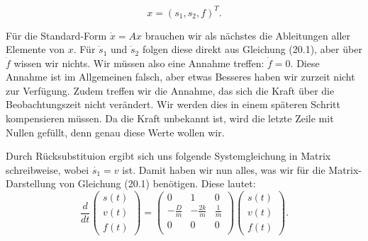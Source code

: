 \[ 
 x = (s_1, s_2, f)^T.
  \] 
  
Für die Standard-Form $\dot x = Ax$ brauchen wir als nächstes die Ableitungen aller Elemente von $x$. Für $\dot s_1$ und $\dot s_2$ folgen diese direkt aus Gleichung (20.1), aber über $\dot f$ wissen wir nichts. 
Wir müssen also eine Annahme treffen: $\dot f = 0$. Diese Annahme ist im Allgemeinen falsch, aber etwas Besseres haben wir zurzeit nicht zur Verfügung. 
Zudem treffen wir die Annahme, das sich die Kraft über die Beobachtungszeit nicht verändert.
Wir werden dies in einem späteren Schritt kompensieren müssen.
Da die Kraft unbekannt ist, wird die letzte Zeile mit Nullen gefüllt, denn genau diese Werte wollen wir. 


Durch Rücksubstituion ergibt sich uns folgende Systemgleichung in Matrix schreibweise, wobei $\dot {s_1}= v$ ist. Damit haben wir nun alles, was wir für die Matrix-Darstellung von Gleichung (20.1) benötigen. Diese lautet:
\begin{equation}
\frac{d}{dt} \left(\begin{array}{c} s(t) \\ v(t) \\ f(t) \end{array}\right) = \left(
 \begin{array}{ccc} 	
0 & 1& 0 \\ 
- \frac{D}{m} &-\frac{2k}{m} & \frac{1} {m}\\
0 & 0 & 0\\
\end{array}\right)  \left(\begin{array}{c} s(t)\\ v(t)\\ f(t) \end{array}\right).
\end{equation}












